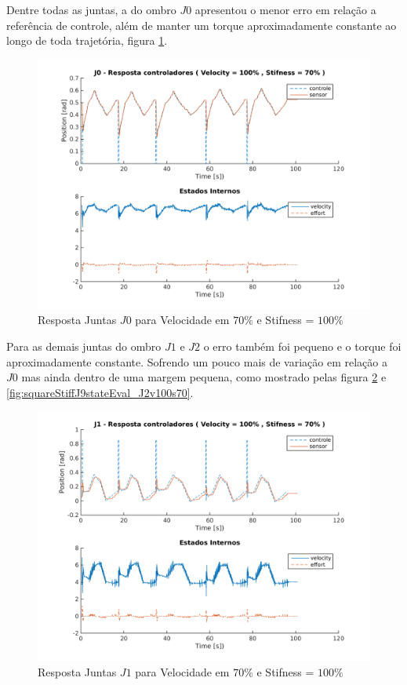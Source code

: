 Dentre todas as juntas, a do ombro $J0$ apresentou o menor erro em relação a referência de controle, além de manter um torque aproximadamente constante ao longo de toda trajetória, figura \ref{fig:squareStiffJ9stateEval_J0v100s70}.

\vspace{1cm}

\begin{figure}[H]
    \centering
    \includegraphics[width=0.6\linewidth,trim={2cm 1cm 2cm 2cm}]{tex/figs/squareStiffJ9stateEval_J0v100s70.png}
    \caption{Resposta Juntas $J0$ para Velocidade em $70\%$ e Stifness = $100\%$ }
    \label{fig:squareStiffJ9stateEval_J0v100s70}
\end{figure}

Para as demais juntas do ombro $J1$ e $J2$ o erro também foi pequeno e o torque foi aproximadamente constante. Sofrendo um pouco mais de variação em relação a $J0$ mas ainda dentro de uma margem pequena, como mostrado pelas figura \ref{fig:squareStiffJ9stateEval_J1v100s70} e \ref{fig:squareStiffJ9stateEval_J2v100s70}.

\vspace{1cm}
\begin{figure}[H]
    \centering
    \includegraphics[width=0.6\linewidth,trim={2cm 1cm 2cm 2cm}]{tex/figs/squareStiffJ9stateEval_J1v100s70.png}
    \caption{Resposta Juntas $J1$ para Velocidade em $70\%$ e Stifness = $100\%$ }
    \label{fig:squareStiffJ9stateEval_J1v100s70}
\end{figure}

